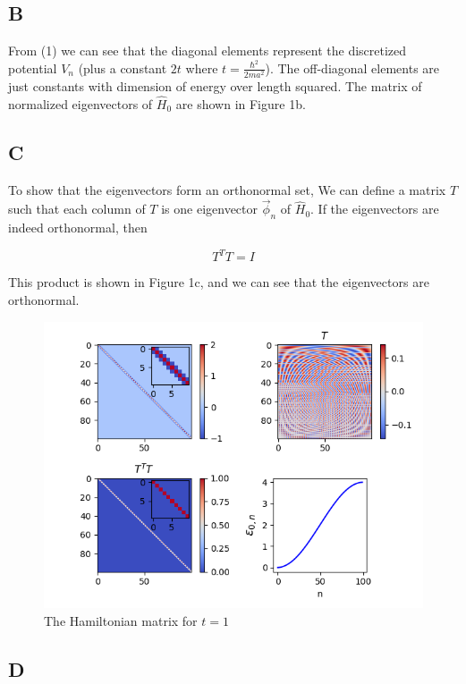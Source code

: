 \documentclass[12pt]{article}
\theoremstyle{definition}
\begin{document}
{\subsection{B}

From (1) we can see that the diagonal elements represent the discretized potential $V_{n}$ (plus a constant $2t$ where $t = \frac{\hbar^{2}}{2ma^{2}}$). The off-diagonal elements are just constants with dimension of energy over length squared. The matrix of normalized eigenvectors of $\hat{H}_{0}$ are shown in Figure 1b.

\subsection{C}

To show that the eigenvectors form an orthonormal set, We can define a matrix $T$ such that each column of $T$ is one eigenvector $\vec{\phi}_{n}$ of $\hat{H}_{0}$. If the eigenvectors are indeed orthonormal, then

\begin{equation*}
T^{T}T = I
\end{equation*}

This product is shown in Figure 1c, and we can see that the eigenvectors are orthonormal.

\begin{figure}[t!]
\centering
\includegraphics[width=15cm]{p1_1}
\caption{The Hamiltonian matrix for $t=1$}
\label{fig:method}
\end{figure}

\subsection{D}

}
\end{document}
